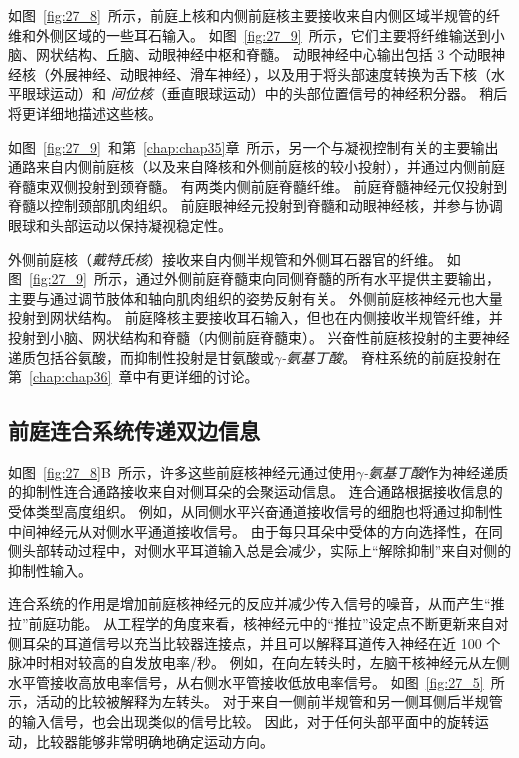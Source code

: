 如图~\ref{fig:27_8}~所示，前庭上核和内侧前庭核主要接收来自内侧区域半规管的纤维和外侧区域的一些耳石输入。
如图~\ref{fig:27_9}~所示，它们主要将纤维输送到小脑、网状结构、丘脑、动眼神经中枢和脊髓。
动眼神经中心输出包括 3 个动眼神经核（外展神经、动眼神经、滑车神经），以及用于将头部速度转换为舌下核（水平眼球运动）和 \textit{间位核}（垂直眼球运动）中的头部位置信号的神经积分器。
稍后将更详细地描述这些核。


如图~\ref{fig:27_9}~和第~\ref{chap:chap35}章~所示，另一个与凝视控制有关的主要输出通路来自内侧前庭核（以及来自降核和外侧前庭核的较小投射），并通过内侧前庭脊髓束双侧投射到颈脊髓。
有两类内侧前庭脊髓纤维。
前庭脊髓神经元仅投射到脊髓以控制颈部肌肉组织。
前庭眼神经元投射到脊髓和动眼神经核，并参与协调眼球和头部运动以保持凝视稳定性。


外侧前庭核（\textit{戴特氏核}）接收来自内侧半规管和外侧耳石器官的纤维。
如图~\ref{fig:27_9}~所示，通过外侧前庭脊髓束向同侧脊髓的所有水平提供主要输出，主要与通过调节肢体和轴向肌肉组织的姿势反射有关。
外侧前庭核神经元也大量投射到网状结构。
前庭降核主要接收耳石输入，但也在内侧接收半规管纤维，并投射到小脑、网状结构和脊髓（内侧前庭脊髓束）。
兴奋性前庭核投射的主要神经递质包括谷氨酸，而抑制性投射是甘氨酸或\textit{$\gamma$-氨基丁酸}。
脊柱系统的前庭投射在第~\ref{chap:chap36}~章中有更详细的讨论。



\subsection{前庭连合系统传递双边信息}

如图~\ref{fig:27_8}B~所示，许多这些前庭核神经元通过使用\textit{$\gamma$-氨基丁酸}作为神经递质的抑制性连合通路接收来自对侧耳朵的会聚运动信息。
连合通路根据接收信息的受体类型高度组织。
例如，从同侧水平兴奋通道接收信号的细胞也将通过抑制性中间神经元从对侧水平通道接收信号。
由于每只耳朵中受体的方向选择性，在同侧头部转动过程中，对侧水平耳道输入总是会减少，实际上“解除抑制”来自对侧的抑制性输入。


连合系统的作用是增加前庭核神经元的反应并减少传入信号的噪音，从而产生“推拉”前庭功能。
从工程学的角度来看，核神经元中的“推拉”设定点不断更新来自对侧耳朵的耳道信号以充当比较器连接点，并且可以解释耳道传入神经在近 100 个脉冲时相对较高的自发放电率/秒。
例如，在向左转头时，左脑干核神经元从左侧水平管接收高放电率信号，从右侧水平管接收低放电率信号。
如图~\ref{fig:27_5}~所示，活动的比较被解释为左转头。
对于来自一侧前半规管和另一侧耳侧后半规管的输入信号，也会出现类似的信号比较。
因此，对于任何头部平面中的旋转运动，比较器能够非常明确地确定运动方向。


